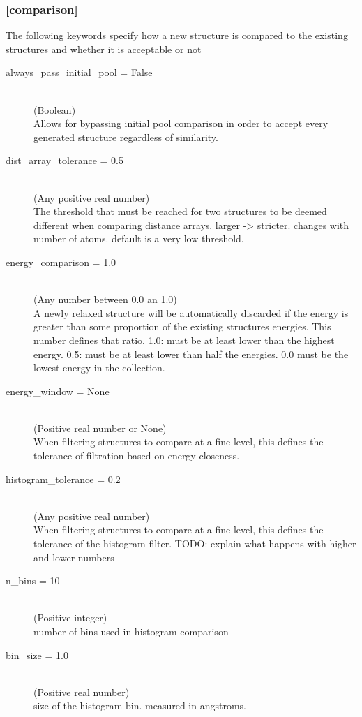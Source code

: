 \subsubsection{[comparison]}
		The following keywords specify how a new structure is compared to the existing structures and whether it is acceptable or not
\begin{description}
		\item[always\_pass\_initial\_pool = False]~\\
			(Boolean)\\
			Allows for bypassing initial pool comparison in order to accept every generated structure regardless of similarity.
		\item[dist\_array\_tolerance = 0.5]~\\
			(Any positive real number)\\
			The threshold that must be reached for two structures to be deemed different when comparing distance arrays. larger -> stricter. changes with number of atoms. default is a very low threshold.
		\item[energy\_comparison = 1.0]~\\
			(Any number between 0.0 an 1.0)\\
			A newly relaxed structure will be automatically discarded if the energy is greater than some proportion of the existing structures energies. This number defines that ratio. 1.0: must be at least lower than the highest energy. 0.5: must be at least lower than half the energies. 0.0 must be the lowest energy in the collection.
		\item[energy\_window = None]~\\
			(Positive real number or None)\\
			When filtering structures to compare at a fine level, this defines the tolerance of filtration based on energy closeness.
		\item[histogram\_tolerance = 0.2]~\\
			(Any positive real number)\\
			When filtering structures to compare at a fine level, this defines the tolerance of the histogram filter.
			TODO: explain what happens with higher and lower numbers
		\item[n\_bins = 10]~\\
			(Positive integer)\\
			number of bins used in histogram comparison
		\item[bin\_size = 1.0]~\\
			(Positive real number)\\
			size of the histogram bin. measured in angstroms.
\end{description}

